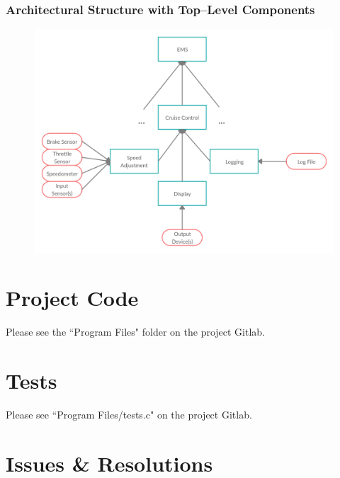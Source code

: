 \documentclass{article}
\begin{document}
	\newpage
	\subsubsection{Architectural Structure with Top--Level Components}
	\begin{figure}[!htb]
		\centering
		\includegraphics[scale=.28]{cs347_5b}
	\end{figure}

	\section{Project Code}
	\indent\indent Please see the ``Program Files" folder on the project Gitlab.
	
	\section{Tests}
	\indent\indent Please see ``Program Files/tests.c" on the project Gitlab.
	
	\section{Issues \& Resolutions}
\end{document}
